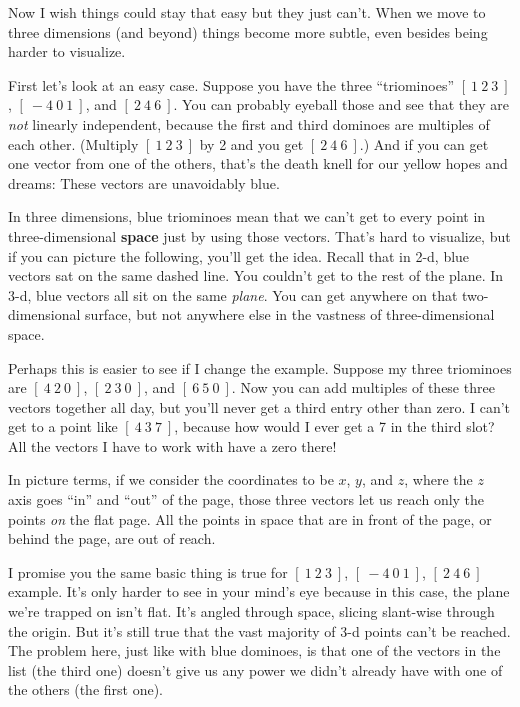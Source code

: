 Now I wish things could stay that easy but they just can't. When we move to
three dimensions (and beyond) things become more subtle, even besides being
harder to visualize.

First let's look at an easy case. Suppose you have the three ``triominoes'' $[\
1\ 2\ 3\ ]$, $[\ -4\ 0\ 1\ ]$, and $[\ 2\ 4\ 6\ ]$. You can probably eyeball
those and see that they are \textit{not} linearly independent, because the
first and third dominoes are multiples of each other. (Multiply $[\ 1\ 2\ 3\ ]$
by 2 and you get $[\ 2\ 4\ 6\ ]$.) And if you can get one vector from one of
the others, that's the death knell for our yellow hopes and dreams: These
vectors are unavoidably blue.

In three dimensions, blue triominoes mean that we can't get to every point in
three-dimensional \textbf{space} just by using those vectors. That's hard to
visualize, but if you can picture the following, you'll get the idea. Recall
that in 2-d, blue vectors sat on the same dashed line. You couldn't get to the
rest of the plane. In 3-d, blue vectors all sit on the same \textit{plane}. You
can get anywhere on that two-dimensional surface, but not anywhere else in the
vastness of three-dimensional space.

Perhaps this is easier to see if I change the example. Suppose my three
triominoes are $[\ 4\ 2\ 0\ ]$, $[\ 2\ 3\ 0\ ]$, and $[\ 6\ 5\ 0\ ]$. Now you
can add multiples of these three vectors together all day, but you'll never get
a third entry other than zero. I can't get to a point like $[\ 4\ 3\ 7\ ]$,
because how would I ever get a 7 in the third slot? All the vectors I have to
work with have a zero there!

In picture terms, if we consider the coordinates to be $x$, $y$, and $z$, where
the $z$ axis goes ``in'' and ``out'' of the page, those three vectors let us
reach only the points \textit{on} the flat page. All the points in space that
are in front of the page, or behind the page, are out of reach.

\smallskip

I promise you the same basic thing is true for $[\ 1\ 2\ 3\ ]$, $[\ -4\ 0\ 1\
]$, $[\ 2\ 4\ 6\ ]$ example. It's only harder to see in your mind's eye because
in this case, the plane we're trapped on isn't flat. It's angled through space,
slicing slant-wise through the origin. But it's still true that the vast
majority of 3-d points can't be reached. The problem here, just like with blue
dominoes, is that one of the vectors in the list (the third one) doesn't give
us any power we didn't already have with one of the others (the first one).

